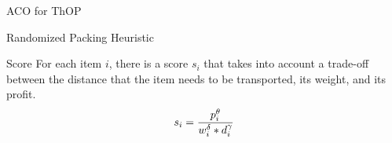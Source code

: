 \documentclass[aspectratio=169]{beamer}
\begin{document}
%         
    

\begin{frame}{ACO for ThOP}
\vspace{0.1cm}
\centering

\end{frame}

\begin{frame}{Randomized Packing Heuristic}
\begin{block}{Score}
\vspace{0.2cm}
For each item $i$, there is a score $s_i$ that takes into account a trade-off between the distance that the item needs to be transported, its weight, and its profit.
\vspace{0.2cm}
$$s_i = {p_i^\theta \over w_i^\delta * d_i^\gamma}$$
\vspace{0.2cm}
\end{block}
\end{frame}
\end{document}
